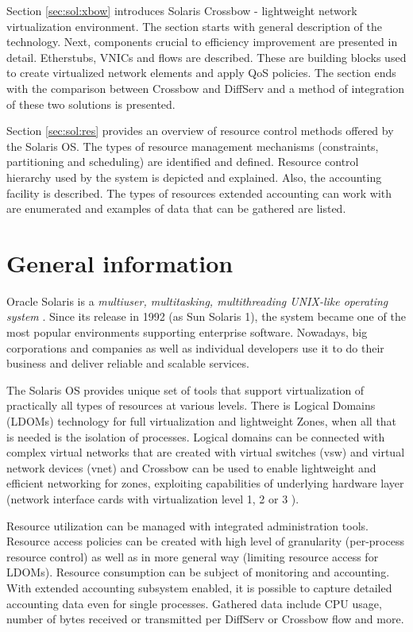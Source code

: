 \documentclass[11pt]{book}
\begin{document}
    Section \ref{sec:sol:xbow} introduces Solaris Crossbow - lightweight network virtualization environment. The
    section starts with general description of the technology. Next, components crucial to efficiency improvement are
    presented in detail. Etherstubs, VNICs and flows are described. These are building blocks used to create
    virtualized network elements and apply QoS policies. The section ends with the comparison between Crossbow and
    DiffServ and a method of integration of these two solutions is presented.

    Section \ref{sec:sol:res} provides an overview of resource control methods offered by the Solaris OS. The types
    of resource management mechanisms (constraints, partitioning and scheduling) are identified and defined. Resource
    control hierarchy used by the system is depicted and explained. Also, the accounting facility is described. The
    types of resources extended accounting can work with are enumerated and examples of data that can be gathered are
    listed.


    \section{General information}
    \label{sec:sol:general}

      Oracle Solaris is a \textit{multiuser, multitasking, multithreading UNIX-like operating system} \cite{reference}.
      Since its release in 1992 (as Sun Solaris 1), the system became one of the most popular environments supporting
      enterprise software. Nowadays, big corporations and companies as well as individual developers use it to do their
      business and deliver reliable and scalable services.

      The Solaris OS provides unique set of tools that support virtualization of practically all types of resources at
      various levels. There is Logical Domains (LDOMs) technology for full virtualization and lightweight Zones, when
      all that is needed is the isolation of processes. Logical domains can be connected with complex virtual networks
      that are created with virtual switches (vsw) and virtual network devices (vnet) \cite{ldomag} and Crossbow can be
      used to enable lightweight and efficient networking for zones, exploiting capabilities of underlying hardware
      layer (network interface cards with virtualization level 1, 2 or 3 \cite{santos}).

      Resource utilization can be managed with integrated administration tools. Resource access policies can be created
      with high level of granularity (per-process resource control) as well as in more general way (limiting resource
      access for LDOMs). Resource consumption can be subject of monitoring and accounting. With extended accounting
      subsystem enabled, it is possible to capture detailed accounting data even for single processes. Gathered data
      include CPU usage, number of bytes received or transmitted per DiffServ or Crossbow flow and more.
\end{document}
